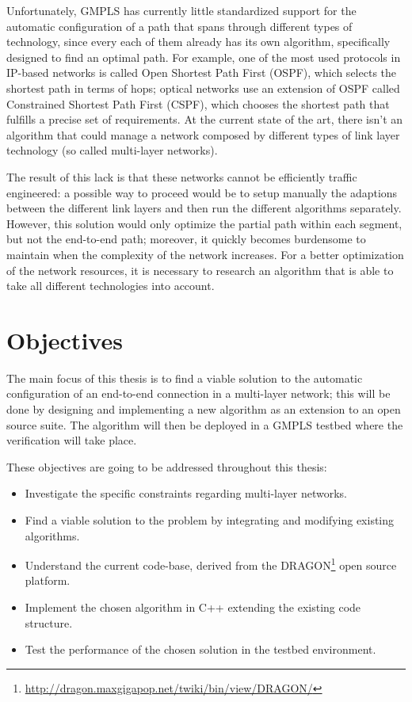 \documentclass[10pt,a4paper]{report}
\begin{document}
Unfortunately, GMPLS has currently little standardized support for the
automatic configuration of a path that spans through different types
of technology, since every each of them already has its own algorithm,
specifically designed to find an optimal path. For example, one of the
most used protocols in IP-based networks is called Open Shortest Path
First (OSPF), which selects the shortest path in terms of hops;
optical networks use an extension of OSPF called Constrained Shortest
Path First (CSPF), which chooses the shortest path that fulfills a
precise set of requirements. At the current state of the art, there
isn't an algorithm that could manage a network composed by different
types of link layer technology (so called multi-layer networks).

The result of this lack is that these networks cannot be efficiently
traffic engineered: a possible way to proceed would be to setup
manually the adaptions between the different link layers and then run
the different algorithms separately. However, this solution would only
optimize the partial path within each segment, but not the end-to-end
path; moreover, it quickly becomes burdensome to maintain when the
complexity of the network increases. For a better optimization of the
network resources, it is necessary to research an algorithm that is
able to take all different technologies into account.

\newpage

\section{Objectives}
The main focus of this thesis is to find a viable solution to the
automatic configuration of an end-to-end connection in a multi-layer
network; this will be done by designing and implementing a new
algorithm as an extension to an open source suite. The algorithm will
then be deployed in a GMPLS testbed where the verification will take
place.

These objectives are going to be addressed throughout this thesis:
\begin{itemize}
\item Investigate the specific constraints regarding multi-layer
  networks.
\item Find a viable solution to the problem by integrating and
  modifying existing algorithms.
\item Understand the current code-base, derived from the
  DRAGON\footnote{\url{http://dragon.maxgigapop.net/twiki/bin/view/DRAGON/}}
  open source platform.
\item Implement the chosen algorithm in C++ extending the existing
  code structure.
\item Test the performance of the chosen solution in the testbed
  environment.
\end{itemize}
\end{document}
